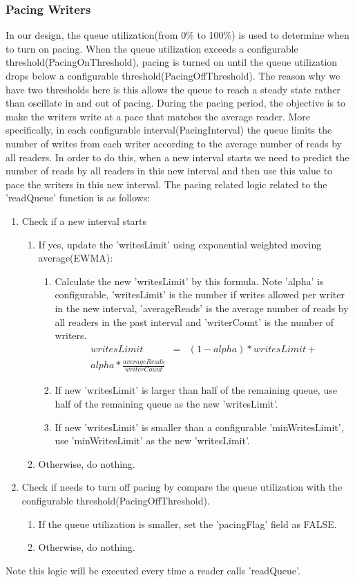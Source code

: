 \subsubsection{\label{sub:queue:control:pacing}{Pacing Writers}}
In our design, the queue utilization(from 0\% to 100\%) is used to determine when to turn on pacing.  When the queue utilization exceeds a configurable threshold(PacingOnThreshold), pacing is turned on until the queue utilization drops below a configurable threshold(PacingOffThreshold).  The reason why we have two thresholds here is this allows the queue to reach a steady state rather than oscillate in and out of pacing.
During the pacing period, the objective is to make the writers write at a pace that matches the average reader. More specifically, in each configurable interval(PacingInterval) the queue limits the number of writes from each writer according to the average number of reads by all readers. 
In order to do this,  when a new interval starts we need to predict the number of reads by all readers in this new interval and then use this value to pace the writers in this new interval.   
The pacing related logic related to the 'readQueue' function is as follows:
\begin{enumerate}
	\item{Check if a new interval starts}
		\begin{enumerate}
		\item{If yes,  update the 'writesLimit' using exponential weighted moving average(EWMA):}
				\begin{enumerate}
					\item{Calculate the new 'writesLimit' by this formula. Note 'alpha' is configurable, 'writesLimit' is the number if writes allowed per writer in the new interval, 'averageReads' is the average number of reads by all readers in the past interval and 'writerCount' is the number of writers.}						
								\begin{eqnarray*}
writesLimit&=& (1-alpha) * writesLimit + \\ 
alpha *  \frac{averageReads}{writerCount}
						\end{eqnarray*}
						\item{If new 'writesLimit' is larger than half of the remaining queue, use half of the remaining queue as the new 'writesLimit'. }
					\item{If new 'writesLimit' is smaller than a configurable 'minWritesLimit', use 'minWritesLimit' as the new 'writesLimit'. }
				\end{enumerate}
		\item{Otherwise, do nothing.}
		\end{enumerate}
		\item{Check if needs to turn off pacing by compare the queue utilization with the configurable threshold(PacingOffThreshold).}
		\begin{enumerate}
			\item{If the queue utilization is smaller, set the 'pacingFlag' field as FALSE. }
			\item{Otherwise, do nothing.}
		\end{enumerate}
\end{enumerate}
Note this logic will be executed every time a reader calls 'readQueue'.

